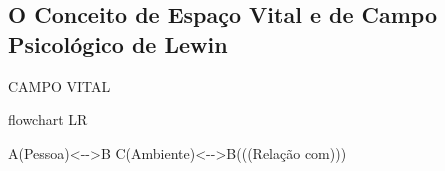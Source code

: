 \documentclass[
]{book}
\newenvironment{Shaded}{\begin{snugshade}}{\end{snugshade}}
\newcommand{\NormalTok}[1]{#1}
\begin{document}
\hypertarget{o-conceito-de-espauxe7o-vital-e-de-campo-psicoluxf3gico-de-lewin}{%
\subsection{\texorpdfstring{O Conceito de \textbf{Espaço Vital} e de \textbf{Campo Psicológico} de Lewin}{O Conceito de Espaço Vital e de Campo Psicológico de Lewin}}\label{o-conceito-de-espauxe7o-vital-e-de-campo-psicoluxf3gico-de-lewin}}

CAMPO VITAL

\begin{Shaded}
\begin{Highlighting}[]
\NormalTok{flowchart LR}

\NormalTok{A(Pessoa)\textless{}{-}{-}\textgreater{}B}
\NormalTok{C(Ambiente)\textless{}{-}{-}\textgreater{}B(((Relação com)))}
\end{Highlighting}
\end{Shaded}
\end{document}
